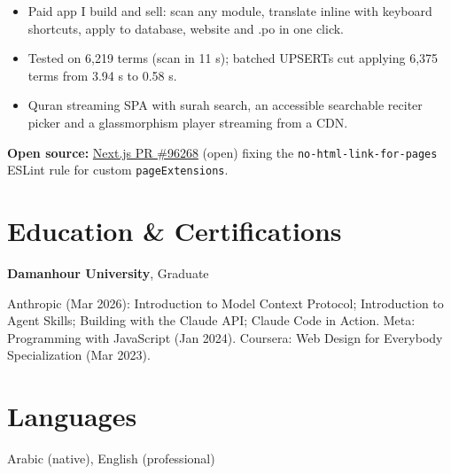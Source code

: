 \documentclass[10pt,a4paper]{article}
\begin{document}
\begin{itemize}
  \item Paid app I build and sell: scan any module, translate inline with keyboard shortcuts, apply to database, website and .po in one click.
  \item Tested on 6,219 terms (scan in 11 s); batched UPSERTs cut applying 6,375 terms from 3.94 s to 0.58 s.
\end{itemize}

\begin{itemize}
  \item Quran streaming SPA with surah search, an accessible searchable reciter picker and a glassmorphism player streaming from a CDN.
\end{itemize}

\textbf{Open source:} \href{https://github.com/vercel/next.js/pull/96268}{Next.js PR \#96268} (open) fixing the
\texttt{no-html-link-for-pages} ESLint rule for custom \texttt{pageExtensions}.

\section*{Education \& Certifications}
\textbf{Damanhour University}, Graduate\par\vspace{2pt}
Anthropic (Mar 2026): Introduction to Model Context Protocol; Introduction to Agent Skills; Building with the Claude API; Claude Code in Action.
Meta: Programming with JavaScript (Jan 2024). Coursera: Web Design for Everybody Specialization (Mar 2023).

\section*{Languages}
Arabic (native), English (professional)
\end{document}
